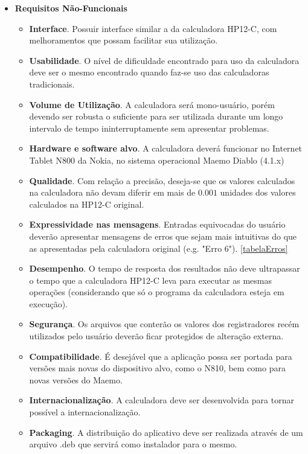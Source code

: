 \begin{itemize}
\begin{itemize}
	\end{itemize}
 \item \textbf{Requisitos Não-Funcionais}
	\begin{itemize}
	 \item \textbf{Interface}. Possuir interface similar a da calculadora HP12-C, com melhoramentos que possam facilitar sua utilização.
	 \item \textbf{Usabilidade}. O nível de dificuldade encontrado para uso da calculadora deve ser o mesmo encontrado quando faz-se uso das calculadoras tradicionais.
	 \item \textbf{Volume de Utilização}. A calculadora será mono-usuário, porém devendo ser robusta o suficiente para ser utilizada durante um longo intervalo de tempo ininterruptamente sem apresentar problemas.
	 \item \textbf{Hardware e software alvo}. A calculadora deverá funcionar no Internet Tablet N800 da Nokia, no sistema operacional Maemo Diablo (4.1.x) 
	 \item \textbf{Qualidade}. Com relação a precisão, deseja-se que os valores calculados na calculadora não devam diferir em mais de $0.001$ unidades dos valores calculados na HP12-C original.
	 \item \textbf{Expressividade nas mensagens}. Entradas equivocadas do usuário deverão apresentar mensagens de erros que sejam mais intuitivas do que as apresentadas pela calculadora original (e.g. "Erro 6"). \ref{tabelaErros}
	 \item \textbf{Desempenho}. O tempo de resposta dos resultados não deve ultrapassar o tempo que a calculadora HP12-C leva para executar as mesmas operações (considerando que só o programa da calculadora esteja em execução).
	 \item \textbf{Segurança}. Os arquivos que conterão os valores dos registradores recém utilizados pelo usuário deverão ficar protegidos de alteração externa.
	 \item \textbf{Compatibilidade}. É desejável que a aplicação possa ser portada para versões mais novas do dispositivo alvo, como o N810, bem como para novas versões do Maemo.
	 \item \textbf{Internacionalização}. A calculadora deve ser desenvolvida para tornar possível a internacionalização. 
	 \item \textbf{Packaging}. A distribuição do aplicativo deve ser realizada através de um arquivo .deb que servirá como instalador para o mesmo.
	\end{itemize}
\end{itemize}
